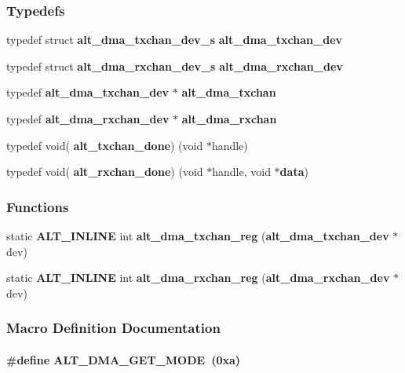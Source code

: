 \subsubsection*{Typedefs}
\begin{DoxyCompactItemize}
\item 
typedef struct {\bf alt\+\_\+dma\+\_\+txchan\+\_\+dev\+\_\+s} {\bf alt\+\_\+dma\+\_\+txchan\+\_\+dev}
\item 
typedef struct {\bf alt\+\_\+dma\+\_\+rxchan\+\_\+dev\+\_\+s} {\bf alt\+\_\+dma\+\_\+rxchan\+\_\+dev}
\item 
typedef {\bf alt\+\_\+dma\+\_\+txchan\+\_\+dev} $\ast$ {\bf alt\+\_\+dma\+\_\+txchan}
\item 
typedef {\bf alt\+\_\+dma\+\_\+rxchan\+\_\+dev} $\ast$ {\bf alt\+\_\+dma\+\_\+rxchan}
\item 
typedef void( {\bf alt\+\_\+txchan\+\_\+done}) (void $\ast$handle)
\item 
typedef void( {\bf alt\+\_\+rxchan\+\_\+done}) (void $\ast$handle, void $\ast${\bf data})
\end{DoxyCompactItemize}
\subsubsection*{Functions}
\begin{DoxyCompactItemize}
\item 
static {\bf A\+L\+T\+\_\+\+I\+N\+L\+I\+NE} int {\bf alt\+\_\+dma\+\_\+txchan\+\_\+reg} ({\bf alt\+\_\+dma\+\_\+txchan\+\_\+dev} $\ast$dev)
\item 
static {\bf A\+L\+T\+\_\+\+I\+N\+L\+I\+NE} int {\bf alt\+\_\+dma\+\_\+rxchan\+\_\+reg} ({\bf alt\+\_\+dma\+\_\+rxchan\+\_\+dev} $\ast$dev)
\end{DoxyCompactItemize}


\subsubsection{Macro Definition Documentation}
\paragraph[{A\+L\+T\+\_\+\+D\+M\+A\+\_\+\+G\+E\+T\+\_\+\+M\+O\+DE}]{\setlength{\rightskip}{0pt plus 5cm}\#define A\+L\+T\+\_\+\+D\+M\+A\+\_\+\+G\+E\+T\+\_\+\+M\+O\+DE~(0xa)}\label{alt__dma__dev_8h_a5e3f106b99dd56f082a9d77222806f06}


